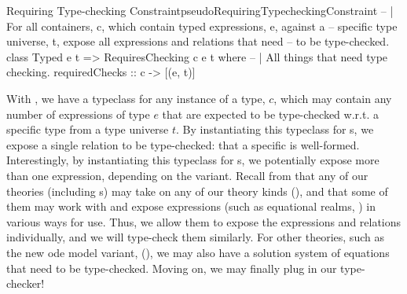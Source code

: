 \begin{pseudohaskell}{Requiring Type-checking Constraint}{pseudoRequiringTypecheckingConstraint}
-- | For all containers, c, which contain typed expressions, e, against a
--   specific type universe, t, expose all expressions and relations that need 
--   to be type-checked.
class Typed e t => RequiresChecking c e t where
  -- | All things that need type checking.
  requiredChecks :: c -> [(e, t)]
\end{pseudohaskell}

With , we have a typeclass for any instance of a
type, \(c\), which may contain any number of expressions of type \(e\) that are
expected to be type-checked w.r.t. a specific type from a type universe \(t\).
By instantiating this typeclass for \DataDefinition{}s, we expose a single
relation to be type-checked: that a specific \QDefinition{} is well-formed.
Interestingly, by instantiating this typeclass for \InstanceModel{}s, we
potentially expose more than one expression, depending on the \ModelKind{}
variant. Recall from  that any of our theories (including
\InstanceModel{}s) may take on any of our theory kinds (\ModelKinds{}), and that
some of them may work with and expose expressions (such as equational realms,
)
in various ways for use. Thus, we allow them to expose the expressions and
relations individually, and we will type-check them similarly. For other
theories, such as the new \acs{ode} model variant, \NewDEModel{}
(\DifferentialModel{}), we may also have a solution system of equations
\cite{Chen2022MEng} that need to be type-checked. Moving on, we may finally plug
in our type-checker!

